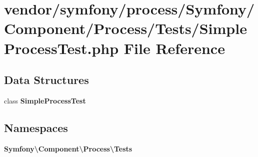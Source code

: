 \section{vendor/symfony/process/\+Symfony/\+Component/\+Process/\+Tests/\+Simple\+Process\+Test.php File Reference}
\label{_simple_process_test_8php}
\subsection*{Data Structures}
\begin{DoxyCompactItemize}
\item 
class {\bf Simple\+Process\+Test}
\end{DoxyCompactItemize}
\subsection*{Namespaces}
\begin{DoxyCompactItemize}
\item 
 {\bf Symfony\textbackslash{}\+Component\textbackslash{}\+Process\textbackslash{}\+Tests}
\end{DoxyCompactItemize}
